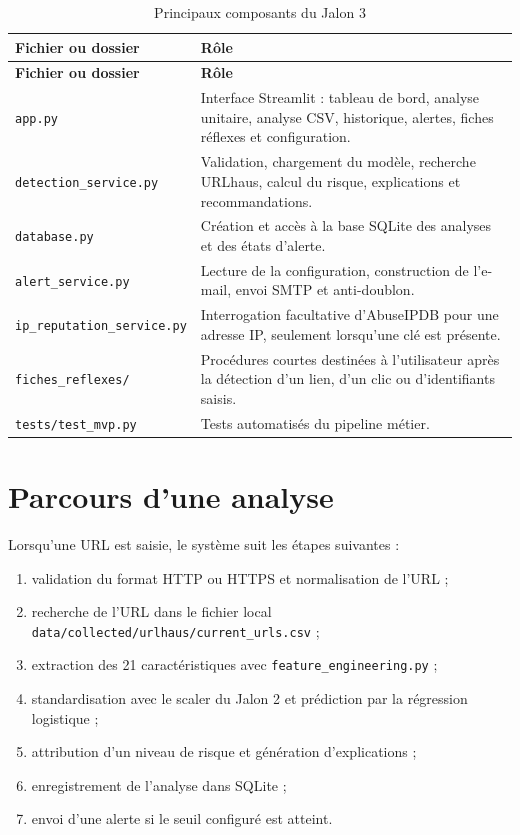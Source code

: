 \documentclass[11pt,a4paper]{report}
\begin{document}
\begin{longtable}{p{}p{}}
\caption{Principaux composants du Jalon 3}\\
\toprule
\textbf{Fichier ou dossier} & \textbf{Rôle}\\
\midrule
\endfirsthead
\toprule
\textbf{Fichier ou dossier} & \textbf{Rôle}\\
\midrule
\endhead
\texttt{app.py} & Interface Streamlit : tableau de bord, analyse unitaire,
analyse CSV, historique, alertes, fiches réflexes et configuration.\\
\texttt{detection\_service.py} & Validation, chargement du modèle, recherche
URLhaus, calcul du risque, explications et recommandations.\\
\texttt{database.py} & Création et accès à la base SQLite des analyses et
des états d'alerte.\\
\texttt{alert\_service.py} & Lecture de la configuration, construction de
l'e-mail, envoi SMTP et anti-doublon.\\
\texttt{ip\_reputation\_service.py} & Interrogation facultative d'AbuseIPDB
pour une adresse IP, seulement lorsqu'une clé est présente.\\
\texttt{fiches\_reflexes/} & Procédures courtes destinées à l'utilisateur
après la détection d'un lien, d'un clic ou d'identifiants saisis.\\
\texttt{tests/test\_mvp.py} & Tests automatisés du pipeline métier.\\
\bottomrule
\end{longtable}

\section{Parcours d'une analyse}

Lorsqu'une URL est saisie, le système suit les étapes suivantes :

\begin{enumerate}
  \item validation du format HTTP ou HTTPS et normalisation de l'URL ;
  \item recherche de l'URL dans le fichier local
        \texttt{data/collected/urlhaus/current\_urls.csv} ;
  \item extraction des 21 caractéristiques avec
        \texttt{feature\_engineering.py} ;
  \item standardisation avec le scaler du Jalon 2 et prédiction par la
        régression logistique ;
  \item attribution d'un niveau de risque et génération d'explications ;
  \item enregistrement de l'analyse dans SQLite ;
  \item envoi d'une alerte si le seuil configuré est atteint.
\end{enumerate}
\end{document}
